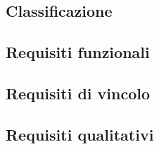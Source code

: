 \subsection{Classificazione}

\subsection{Requisiti funzionali}

\subsection{Requisiti di vincolo}

\subsection{Requisiti qualitativi}
